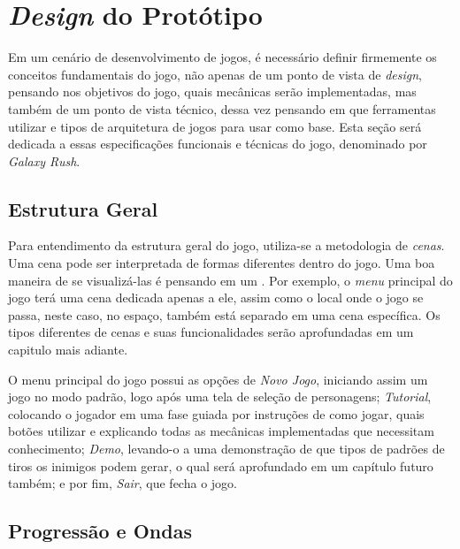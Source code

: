 \section{\textit{Design} do Protótipo}

Em um cenário de desenvolvimento de jogos, é necessário definir firmemente os conceitos fundamentais do jogo, não apenas de um ponto de vista de \textit{design}, pensando nos objetivos do jogo, quais mecânicas serão implementadas, mas também de um ponto de vista técnico, dessa vez pensando em que ferramentas utilizar e tipos de arquitetura de jogos para usar como base. Esta seção será dedicada a essas especificações funcionais e técnicas do jogo, denominado por \textit{Galaxy Rush}.

\subsection{Estrutura Geral}

Para entendimento da estrutura geral do jogo, utiliza-se a metodologia de \textit{cenas}\label{Cenas}. Uma cena pode ser interpretada de formas diferentes dentro do jogo. Uma boa maneira de se visualizá-las é pensando em um \textquotedbl{}. Por exemplo, o \textit{menu} principal do jogo terá uma cena dedicada apenas a ele, assim como o local onde o jogo se passa, neste caso, no espaço, também está separado em uma cena específica. Os tipos diferentes de cenas e suas funcionalidades serão aprofundadas em um capitulo mais adiante.

O menu principal do jogo possui as opções de \textit{Novo Jogo}, iniciando assim um jogo no modo padrão, logo após uma tela de seleção de personagens; \textit{Tutorial}, colocando o jogador em uma fase guiada por instruções de como jogar, quais botões utilizar e explicando todas as mecânicas implementadas que necessitam conhecimento; \textit{Demo}, levando-o a uma demonstração de que tipos de padrões de tiros os inimigos podem gerar, o qual será aprofundado em um capítulo futuro também; e por fim, \textit{Sair}, que fecha o jogo.

\subsection{Progressão e Ondas}\label{ONDASNOMAR}

